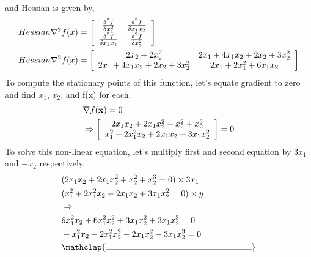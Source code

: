 \documentclass[a4paper,10pt]{article}
\begin{document}
\begin{enumerate}
\begin{equation}
\begin{split}
        \end{split}
    \end{equation}
    and Hessian is given by,
    \begin{equation}
        \begin{split}
          Hessian \nabla^2f(x) & = \left[\begin{array}{c c} \frac{\delta^2f}{\delta x_1^2} &\frac{\delta^2f}{\delta x_1x_2}  \\  \frac{\delta^2f}{\delta x_2x_1}  &\frac{\delta^2f}{\delta x_2^2} \end{array} \right] \\
          Hessian \nabla^2f(x) & = \left[\begin{array}{c c} 2x_2 + 2x_2^2  &2x_1 + 4x_1x_2 + 2x_2 + 3x_2^2  \\  2x_1 + 4x_1x_2 + 2x_2 + 3x_2^2  &2x_1 + 2x_1^2 + 6x_1x_2 \end{array} \right]
        \end{split}
    \end{equation}
    To compute the stationary points of this function, let's equate gradient to zero and find $x_1$, $x_2$, and f(x) for each.
    \begin{equation}
        \begin{split}
          & \nabla f(\mathbf{x}) = 0 \\
          & \Rightarrow \left[\begin{array}{c c} 2x_1x_2 + 2x_1x_2^2 + x_2^2 + x_2^3 \\ x_1^2 + 2x_1^2x_2 + 2x_1x_2 + 3x_1x_2^2 \end{array} \right] = 0 \\
        \end{split}
    \end{equation}
    To solve this non-linear equation, let's multiply first and second equation by $3x_1$ and $-x_2$ respectively,
    \begin{equation}
        \begin{split}
           & (2x_1x_2 + 2x_1x_2^2 + x_2^2 + x_2^3 = 0) \times 3x_1\\
          & (x_1^2 + 2x_1^2x_2 + 2x_1x_2 + 3x_1x_2^2 = 0) \times y \\
          & \Rightarrow \\
          & 6x_1^2x_2 + 6x_1^2x_2^2 + 3x_1x_2^2 + 3x_1x_2^3 = 0 \\
          & -x_1^2x_2 - 2x_1^2x_2^2 - 2x_1x_2^2 - 3x_1x_2^3 = 0 \\
          & \mathclap{\rule{6cm}{0.4pt}}\\

\end{split}
\end{equation}
\end{enumerate}
\end{document}
